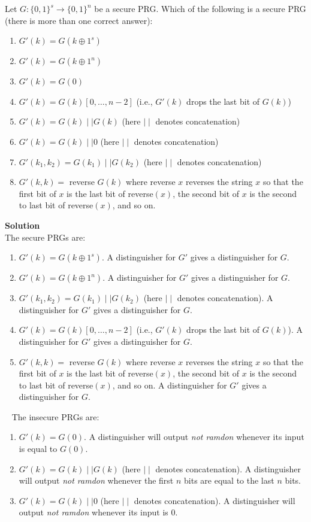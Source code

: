 \documentclass[a4paper,12pt]{article}
\begin{document}
Let $G:\{0,1\}^{s}\rightarrow \{0,1\}^{n}$ be a secure PRG. Which of the following is a secure PRG (there is more than one correct answer):
%
\begin{enumerate}
\item $G'(k)=G(k\oplus 1^{s})$
\item $G'(k)=G(k\oplus 1^{n})$
\item $G'(k)=G(0)$
\item $G'(k)=G(k)[0,…,n - 2]$     (i.e., $G′(k)$ drops the last bit of $G(k)$)
\item $G'(k)=G(k)\mid \mid G(k)$     (here $\mid \mid$ denotes concatenation)
\item $G'(k)=G(k)\mid \mid 0$     (here $\mid \mid$ denotes concatenation)
\item $G'(k_{1},k_{2})=G(k_{1})\mid \mid G(k_{2})$     (here $\mid \mid$ denotes concatenation)
\item $G'(k,k)=$ reverse $G(k)$ where reverse $x$ reverses the string $x$ so that the first bit of $x$ is the last bit of reverse$(x)$, the second bit of $x$ is the second to last bit of reverse$(x)$, and so on.
\end{enumerate}

\textbf{Solution} \\

The secure PRGs are:
%
\begin{enumerate}
\item $G'(k)=G(k\oplus 1^{s})$. A distinguisher for $G'$ gives a distinguisher for $G$.
\item $G'(k)=G(k\oplus 1^{n})$. A distinguisher for $G'$ gives a distinguisher for $G$.
\item $G'(k_{1},k_{2})=G(k_{1})\mid \mid G(k_{2})$ (here $\mid \mid$ denotes concatenation). A distinguisher for $G'$ gives a distinguisher for $G$.
\item $G'(k)=G(k)[0,…,n - 2]$ (i.e., $G'(k)$ drops the last bit of $G(k)$). A distinguisher for $G'$ gives a distinguisher for $G$.
\item $G'(k,k)=$ reverse $G(k)$ where reverse $x$ reverses the string $x$ so that the first bit of $x$ is the last bit of reverse$(x)$, the second bit of $x$ is the second to last bit of reverse$(x)$, and so on. A distinguisher for $G'$ gives a distinguisher for $G$.
\end{enumerate}
%
\ \newpage
%
The insecure PRGs are:
%
\begin{enumerate}
\item $G'(k)=G(0)$. A distinguisher will output \emph{not ramdon} whenever its input is equal to $G(0)$.
\item $G'(k)=G(k)\mid \mid G(k)$ (here $\mid \mid$ denotes concatenation). A distinguisher will output \emph{not ramdon} whenever the first $n$ bits are equal to the last $n$ bits.
\item $G'(k)=G(k)\mid \mid 0$ (here $\mid \mid$ denotes concatenation). A distinguisher will output \emph{not ramdon} whenever its input is $0$.
\end{enumerate}
\end{document}

